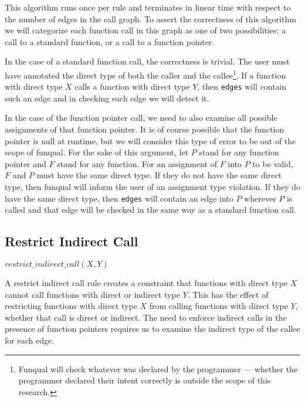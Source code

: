 This algorithm runs once per rule and terminates in linear time with respect to the number of edges in the call graph.  To assert the correctness of this algorithm we will categorize each function call in this graph as one of two possibilities:  a call to a standard function, or a call to a function pointer.


In the case of a standard function call, the correctness is trivial.  The user must have annotated the direct type of both the caller and the callee\footnote{Funqual will check whatever was declared by the programmer --- whether the programmer declared their intent correctly is outside the scope of this research.}.  If a function with direct type $X$ calls a function with direct type $Y$, then \lstinline{edges} will contain such an edge and in checking each edge we will detect it.  

In the case of the function pointer call, we need to also examine all possible assignments of that function pointer.  It is of course possible that the function pointer is null at runtime, but we will consider this type of error to be out of the scope of funqual.  For the sake of this argument, let $P$ stand for any function pointer and $F$ stand for any function.  For an assignment of $F$ into $P$ to be valid, $F$ and $P$ must have the same direct type.  If they do not have the same direct type, then funqual will inform the user of an assignment type violation.  If they do have the same direct type, then \lstinline{edges} will contain an edge into $P$ wherever $P$ is called and that edge will be checked in the same way as a standard function call.  

\subsection{Restrict Indirect Call}

\begin{center}
    $restrict\_indirect\_call(X, Y)$
\end{center}

A restrict indirect call rule creates a constraint that functions with direct type $X$ cannot call functions with direct or indirect type $Y$.  This has the effect of restricting functions with direct type $X$ from calling functions with direct type $Y$, whether that call is direct or indirect.  The need to enforce indirect calls in the presence of function pointers requires us to examine the indirect type of the callee for each edge.  

